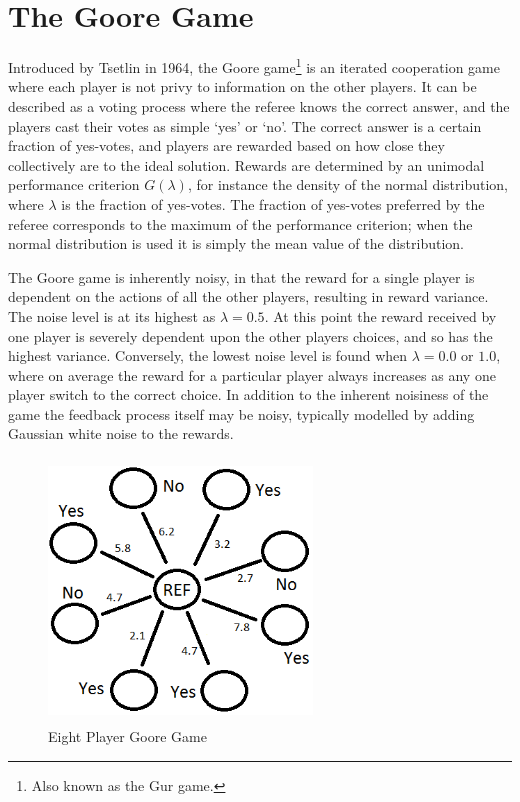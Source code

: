 \section{The Goore Game}
Introduced by Tsetlin \cite{Tsetlin1964} in 1964, the Goore game\footnote{Also known as the Gur game.} is an iterated cooperation game where each player is not privy to information on the other players.
It can be described as a voting process where the referee knows the correct answer, and the players cast their votes as simple ‘yes’ or ‘no’.
The correct answer is a certain fraction of yes-votes, and players are rewarded based on how close they collectively are to the ideal solution.
Rewards are determined by an unimodal performance criterion $G(\lambda)$, for instance the density of the normal distribution, where $\lambda$ is the fraction of yes-votes.
The fraction of yes-votes preferred by the referee corresponds to the maximum of the performance criterion; when the normal distribution is used it is simply the mean value of the distribution. 

The Goore game is inherently noisy, in that the reward for a single player is dependent on the actions of all the other players, resulting in reward variance.
The noise level is at its highest as $\lambda = 0.5$.
At this point the reward received by one player is severely dependent upon the other players choices, and so has the highest variance. 
Conversely, the lowest noise level is found when $\lambda = 0.0\text{ or } 1.0$, where on average the reward for a particular player always increases as any one player switch to the correct choice. 
In addition to the inherent noisiness of the game the feedback process itself may be noisy, typically modelled by adding Gaussian white noise to the rewards.

\begin{figure}[htbp]
\centering
\includegraphics[height=70mm,width=70mm]{images/goore_game}
\caption{Eight Player Goore Game}
\label{fig:gg}
\end{figure}

